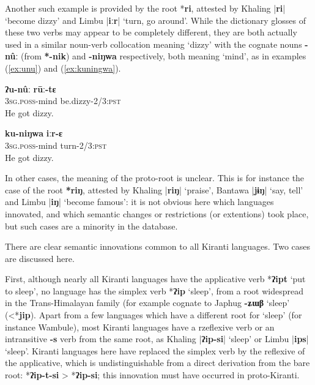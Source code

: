 \documentclass[oldfontcommands,oneside,a4paper,11pt]{article}
\newcommand{\ipa}[1]{\textbf{{\phon\mbox{#1}}}} %
\newcommand{\dhatu}[2]{|\ipa{#1}| `#2'}
\begin{document}
Another such example is provided by the root *\ipa{ri}, attested by Khaling \dhatu{ri}{become dizzy} and Limbu \dhatu{iːr}{turn, go around}. While the dictionary glosses of these two verbs may appear to be completely different, they are both actually used in a similar noun-verb collocation meaning `dizzy' with the cognate nouns \ipa{-nûː} (from \ipa{*-nik}) and \ipa{-niŋwa} respectively, both meaning `mind', as in examples (\ref{ex:unu}) and (\ref{ex:kuningwa}).

\begin{exe}
\ex \label{ex:unu}
\gll \ipa{ʔu-nûː} \ipa{rūː-tɛ} \\
\textsc{3sg.poss}-mind be.dizzy-\textsc{2/3:pst} \\
\glt He got dizzy.
\end{exe}


\begin{exe}
\ex \label{ex:kuningwa}
\gll \ipa{ku-niŋwa} \ipa{iːr-ɛ} \\
\textsc{3sg.poss}-mind turn-\textsc{2/3:pst} \\
\glt He got dizzy.
\end{exe}



In other cases, the meaning of the proto-root is unclear. This is for instance the case of the root \ipa{*riŋ}, attested by Khaling \dhatu{riŋ}{praise}, Bantawa \dhatu{jɨŋ}{say, tell} and Limbu \dhatu{iŋ}{become famous}: it is not obvious here which languages innovated, and which semantic changes or restrictions (or extentions) took place, but such cases are a minority in the database.

There are clear semantic innovations common to all Kiranti languages. Two cases are discussed here.

First, although nearly all Kiranti languages have the applicative verb *\ipa{ʔipt} `put to sleep', no language has the simplex verb *\ipa{ʔip} `sleep', from a root widespread in the Trans-Himalayan family (for example cognate to Japhug \ipa{-ʑɯβ} `sleep' (<*\ipa{jip}). Apart from a few languages which have a different root for `sleep' (for instance Wambule), most Kiranti languages have a rzeflexive verb or an intransitive \ipa{-s} verb from the same root, as Khaling \dhatu{ʔip-si}{sleep} or Limbu \dhatu{ips}{sleep}. Kiranti languages here have replaced the simplex verb by the reflexive of the applicative, which is undistinguishable from a direct derivation from the bare root: *\ipa{ʔip-t-si} > *\ipa{ʔip-si}; this innovation must have occurred in proto-Kiranti.
\end{document}
